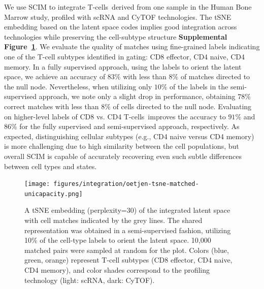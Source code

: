 We use SCIM to integrate T-cells~derived from one sample in the Human Bone Marrow study, profiled with scRNA and CyTOF technologies.
The tSNE embedding based on the latent space codes implies good integration across technologies while preserving the cell-subtype structure \textbf{Supplemental Figure~\ref{fig:oetjen_tsne_uni}}.
We evaluate the quality of matches using fine-grained labels indicating one of the T-cell subtypes identified in gating: CD8 effector, CD4 naive, CD4 memory.
In a fully supervised approach, using the labels to orient the latent space, we achieve an accuracy of $83\%$ with  less than $8\%$ of matches directed to the null node.
Nevertheless, when utilizing only $10\%$ of the labels in the semi-supervised approach, we note only a slight drop in performance, obtaining $78\%$ correct matches with less than $8\%$ of cells directed to the null node.
Evaluating on higher-level labels of CD8 vs.
CD4 T-cells~improves the accuracy to $91\%$ and $86\%$ for the fully supervised and semi-supervised approach, respectively.
As expected, distinguishing cellular subtypes (e.g., CD4 naive versus CD4 memory) is more challenging due to high similarity between the cell populations, but overall SCIM is capable of accurately recovering even such subtle differences between cell types and states.

\begin{figure}[htb]
    \centering
    \texttt{[image: figures/integration/oetjen-tsne-matched-unicapacity.png]}
    \caption{
    A tSNE embedding (perplexity=30) of the integrated latent space with cell matches indicated by the grey lines.
    The shared representation was obtained in a semi-supervised fashion, utilizing 10\% of the cell-type labels to orient the latent space. 10,000 matched pairs were sampled at random for the plot.
    Colors (blue, green, orange) represent T-cell subtypes (CD8 effector, CD4 naive, CD4 memory), and color shades correspond to the profiling technology (light: scRNA, dark: CyTOF).}
    \label{fig:oetjen_tsne_uni}
\end{figure}

